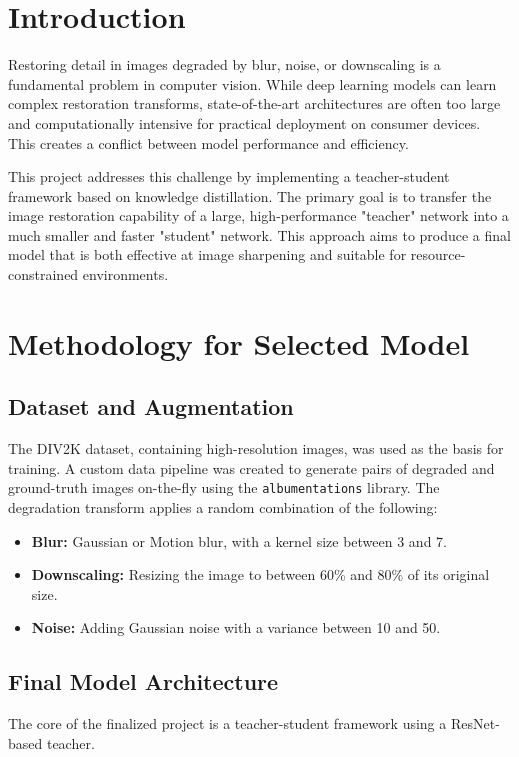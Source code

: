 \documentclass[12pt,a4paper]{article}
\begin{document}
\section{Introduction}
Restoring detail in images degraded by blur, noise, or downscaling is a fundamental problem in computer vision. While deep learning models can learn complex restoration transforms, state-of-the-art architectures are often too large and computationally intensive for practical deployment on consumer devices. This creates a conflict between model performance and efficiency.

This project addresses this challenge by implementing a teacher-student framework based on knowledge distillation. The primary goal is to transfer the image restoration capability of a large, high-performance "teacher" network into a much smaller and faster "student" network. This approach aims to produce a final model that is both effective at image sharpening and suitable for resource-constrained environments.

\newpage
\section{Methodology for Selected Model}

\subsection{Dataset and Augmentation}
The DIV2K dataset, containing high-resolution images, was used as the basis for training. A custom data pipeline was created to generate pairs of degraded and ground-truth images on-the-fly using the \texttt{albumentations} library. The degradation transform applies a random combination of the following:
\begin{itemize}
    \item \textbf{Blur:} Gaussian or Motion blur, with a kernel size between 3 and 7.
    \item \textbf{Downscaling:} Resizing the image to between 60\% and 80\% of its original size.
    \item \textbf{Noise:} Adding Gaussian noise with a variance between 10 and 50.
\end{itemize}

\subsection{Final Model Architecture}
The core of the finalized project is a teacher-student framework using a ResNet-based teacher.
\end{document}
